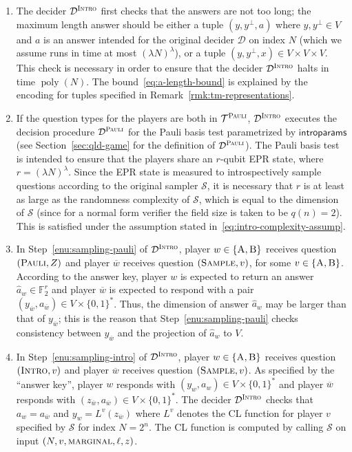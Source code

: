 \documentclass[11pt]{article}
\theoremstyle{definition}
\newcommand{\F}{\ensuremath{\mathbb{F}}}
\DeclareMathOperator{\poly}{poly}
\newcommand{\sampler}{\mathcal{S}}
\newcommand{\decider}{\mathcal{D}}
\newcommand{\type}{\mathcal{T}}
\newcommand{\gamestyle}[1]{\ensuremath{\textsc{#1}}\xspace}
\newcommand{\pauli}{\gamestyle{Pauli}}
\newcommand{\intro}{\gamestyle{Intro}}
\newcommand{\labelstyle}[1]{\ensuremath{\textsc{#1}}\xspace}
\newcommand{\trole}{\ensuremath{v}} %
\newcommand{\alice}{\labelstyle{A}}
\newcommand{\bob}{\labelstyle{B}}
\newcommand{\ab}{\{\alice, \bob\}}
\newcommand{\typestyle}[1]{\ensuremath{\textsc{#1}}\xspace}
\newcommand{\Pauli}{\typestyle{Pauli}}
\newcommand{\Sample}{\typestyle{Sample}}
\newcommand{\Introspect}{\typestyle{Intro}}
\newcommand{\introparams}{\mathsf{introparams}}
\begin{document}
\begin{enumerate}
\item The decider $\decider^\intro$ first checks that the answers are not too
  long; the maximum length answer should be either a tuple $(y, y^\perp, a)$ where
  $y, y^\perp \in V$ and $a$ is an answer intended for the original decider
  $\decider$ on index $N$ (which we assume runs in time at most $(\lambda
  N)^\lambda$), or a tuple $(y,y^\perp,x) \in V \times V \times V$.
  This check is necessary in order to ensure that the decider $\decider^\intro$
  halts in time $\poly(N)$.
  The bound~\eqref{eq:a-length-bound} is explained by the encoding for
  tuples specified in Remark~\ref{rmk:tm-representations}.

\item If the question types for the players are both in $\type^\pauli$,
  $\decider^\intro$ executes the decision procedure $\decider^\pauli$ for the
  Pauli basis test parametrized by $\introparams$ (see
  Section~\ref{sec:qld-game} for the definition of $\decider^\pauli$).
  The Pauli basis test is intended to ensure that the players share an $r$-qubit
  EPR state, where $r = (\lambda N)^\lambda$.
  Since the EPR state is measured to introspectively sample questions according
  to the original sampler $\sampler$, it is necessary that $r$ is at least as
  large as the randomness complexity of $\sampler$, which is equal to the
  dimension of $\sampler$ (since for a normal form verifier the field size is
  taken to be $q(n) = 2$).
  This is satisfied under the assumption stated
  in~\eqref{eq:intro-complexity-assump}.

\item In Step~\ref{enu:sampling-pauli} of $\decider^\intro$, player
  $w\in\{\alice,\bob\}$ receives question $(\Pauli,Z)$ and player $\overline{w}$
  receives question $(\Sample,\trole)$, for some $v\in\{\alice,\bob\}$.
  According to the answer key, player $w$ is expected to return an answer
  $\hat{a}_w\in \F_2^r$ and player $\overline{w}$ is expected to respond with a
  pair $(y_{\overline{w}},a_{\overline{w}}) \in V \times \{0,1\}^*$.
  Thus, the dimension of answer $\hat{a}_w$ may be larger than that of
  $y_{\overline{w}}$; this is the reason that Step~\ref{enu:sampling-pauli}
  checks consistency between $y_{\overline{w}}$ and the projection of
  $\hat{a}_w$ to $V$.



\item In Step~\ref{enu:sampling-intro} of $\decider^\intro$, player $w \in \ab$
  receives question $(\Introspect,\trole)$ and player $\overline{w}$ receives
  question $(\Sample,\trole)$.
  As specified by the ``answer key'', player $w$ responds with $(y_w,a_w) \in V
  \times \{0,1\}^*$ and player $\overline{w}$ responds with
  $(z_{\overline{w}},a_{\overline{w}}) \in V \times \{0,1\}^*$.
  The decider $\decider^\intro$ checks that $a_w = a_{\overline{w}}$ and $y_w =
  L^\trole(z_{\overline{w}})$ where $L^\trole$ denotes the CL function for
  player $\trole$ specified by $\sampler$ for index $N = 2^n$.
  The CL function is computed by calling $\sampler$ on input
  $(N, \trole, \gamestyle{marginal}, \ell, z)$.


\end{enumerate}
\end{document}

